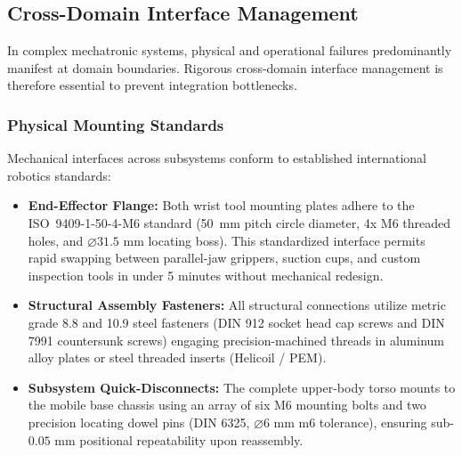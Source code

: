 \subsection{Cross-Domain Interface Management}
In complex mechatronic systems, physical and operational failures predominantly manifest at domain boundaries. Rigorous cross-domain interface management is therefore essential to prevent integration bottlenecks.

\subsubsection{Physical Mounting Standards}
Mechanical interfaces across subsystems conform to established international robotics standards:
\begin{itemize}[leftmargin=1.5em]
  \item \textbf{End-Effector Flange:} Both wrist tool mounting plates adhere to the ISO~9409-1-50-4-M6 standard (50~mm pitch circle diameter, 4x M6 threaded holes, and $\varnothing 31.5\text{ mm}$ locating boss). This standardized interface permits rapid swapping between parallel-jaw grippers, suction cups, and custom inspection tools in under 5 minutes without mechanical redesign.
  \item \textbf{Structural Assembly Fasteners:} All structural connections utilize metric grade 8.8 and 10.9 steel fasteners (DIN 912 socket head cap screws and DIN 7991 countersunk screws) engaging precision-machined threads in aluminum alloy plates or steel threaded inserts (Helicoil / PEM).
  \item \textbf{Subsystem Quick-Disconnects:} The complete upper-body torso mounts to the mobile base chassis using an array of six M6 mounting bolts and two precision locating dowel pins (DIN 6325, $\varnothing 6\text{ mm}$ m6 tolerance), ensuring sub-$0.05\text{ mm}$ positional repeatability upon reassembly.
\end{itemize}

